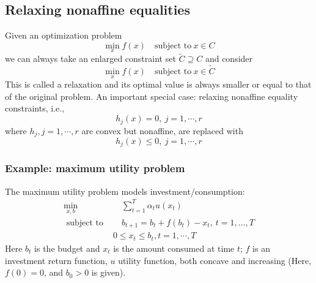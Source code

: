 \documentclass[a4paper]{article}
\begin{document}
{\subsection{Relaxing nonaffine equalities}
Given an optimization problem
\begin{equation}
  \min_x f(x) \quad \text{subject to} \ x \in C \nonumber
\end{equation}
we can always take an enlarged constraint set $\tilde{C} \supseteq C$ and consider 
\begin{equation}
  \min_x f(x) \quad \text{subject to} \ x \in \tilde{C} \nonumber
\end{equation}
This is called a relaxation and its optimal value is always smaller or equal to that of the original problem. An important special case: relaxing nonaffine equality constraints, i.e., 
\begin{equation}
  h_j(x) = 0, \ j=1,\cdots, r \nonumber
\end{equation}
where $h_j, j = 1,\cdots, r$ are convex but nonaffine, are replaced with
\begin{equation}
  h_j(x) \leq 0, \ j=1,\cdots, r \nonumber
\end{equation}

\subsubsection{Example: maximum utility problem}
The maximum utility problem models investment/consumption:
\begin{equation}
  \begin{array}{ll}
    \min\limits_{x, b} & \quad \sum_{t=1}^T \alpha_t u(x_t)  \\
    \text { subject to } &\quad b_{t+1} = b_t + f(b_t) - x_t, \ t=1, \ldots, T \\ \nonumber
    & 0 \leq x_t \leq b_t, t = 1, \cdots, T
\end{array}
\end{equation}
Here $b_t$ is the budget and $x_t$ is the amount consumed at time $t$; $f$ is an investment return function, $u$ utility function, both concave and increasing (Here, $f(0) =0$, and $b_0 > 0$ is given).

}
\end{document}
